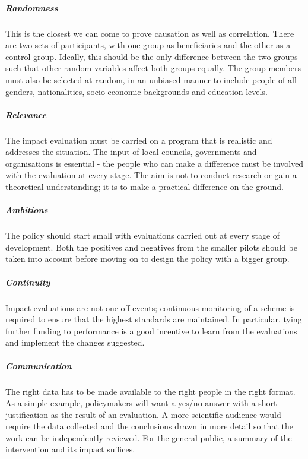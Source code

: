 \documentclass[a4paper, 10pt]{article}
\begin{document}
\subparagraph*{Randomness}
This is the closest we can come to prove causation as well as correlation. There are two sets of participants, with one group as beneficiaries and the other as a control group. Ideally, this should be the only difference between the two groups such that other random variables affect both groups equally. The group members must also be selected at random, in an unbiased manner to include people of all genders, nationalities, socio-economic backgrounds and education levels. 

\subparagraph*{Relevance}
The impact evaluation must be carried on a program that is realistic and addresses the situation. The input of local councils, governments and organisations is essential - the people who can make a difference must be involved with the evaluation at every stage. 	The aim is not to conduct research or gain a theoretical understanding; it is to make a practical difference on the ground. 

\subparagraph*{Ambitions}
The policy should start small with evaluations carried out at every stage of development. Both the positives and negatives from the smaller pilots should be taken into account before moving on to design the policy with a bigger group. 

\subparagraph*{Continuity}
Impact evaluations are not one-off events; continuous monitoring of a scheme is required to ensure that the highest standards are maintained. In particular, tying further funding to performance is a good incentive to learn from the evaluations and implement the changes suggested.  

\subparagraph*{Communication}
The right data has to be made available to the right people in the right format. As a simple example, policymakers will want a yes/no answer with a short justification as the result of an evaluation. A more scientific audience would require the data collected and the conclusions drawn in more detail so that the work can be independently reviewed. For the general public, a summary of the intervention and its impact suffices. 
\end{document}

